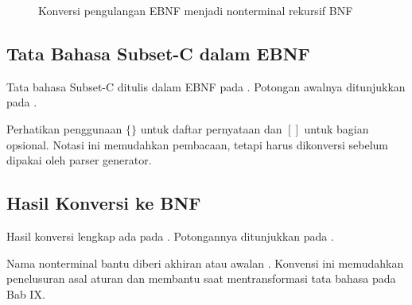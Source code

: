 \begin{figure}[H]
\centering
{}
\caption{Konversi pengulangan EBNF menjadi nonterminal rekursif BNF}
\label{fig:ch08-ebnf-bnf}
\end{figure}

\subsection{Tata Bahasa Subset-C dalam EBNF}

Tata bahasa Subset-C ditulis dalam EBNF pada
. Potongan awalnya ditunjukkan pada
.


Perhatikan penggunaan \(\{ \}\) untuk daftar pernyataan dan
\([ ]\) untuk bagian opsional. Notasi ini memudahkan pembacaan,
tetapi harus dikonversi sebelum dipakai oleh parser generator.

\subsection{Hasil Konversi ke BNF}

Hasil konversi lengkap ada pada . Potongannya
ditunjukkan pada .


Nama nonterminal bantu diberi akhiran  atau awalan
. Konvensi ini memudahkan penelusuran asal aturan dan
membantu saat mentransformasi tata bahasa pada Bab IX.

